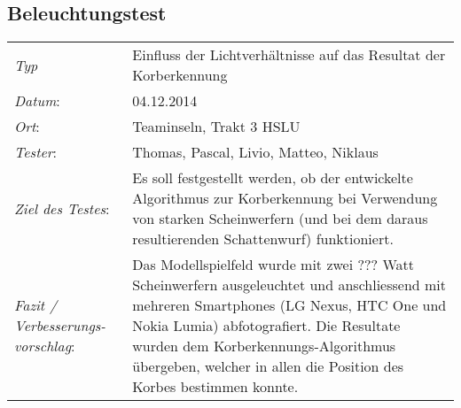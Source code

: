 \subsection{Beleuchtungstest}
\label{chap:LichtTest}
\begin{tabular}{p{3.6cm}p{9.4cm}}
	\rule{0pt}{11pt}\textit{Typ}              & Einfluss der Lichtverhältnisse auf das Resultat der Korberkennung  \\ 
	\rule{0pt}{11pt}\textit{Datum}:           & 04.12.2014   \\
	\rule{0pt}{11pt}\textit{Ort}:             & Teaminseln, Trakt 3 HSLU \\
	\rule{0pt}{11pt}\textit{Tester}:          & Thomas, Pascal, Livio, Matteo, Niklaus\\
	\rule{0pt}{11pt}\textit{Ziel des Testes}: & Es soll festgestellt werden, ob der entwickelte Algorithmus zur Korberkennung bei Verwendung von starken Scheinwerfern (und bei dem daraus resultierenden Schattenwurf) funktioniert.  \\
	\rule{0pt}{11pt}\textit{Fazit / Verbesserungs-\newline vorschlag}: & Das Modellspielfeld wurde mit zwei ??? Watt Scheinwerfern ausgeleuchtet und anschliessend mit mehreren Smartphones (LG Nexus, HTC One und Nokia Lumia) abfotografiert. Die Resultate wurden dem Korberkennungs-Algorithmus übergeben, welcher in allen die Position des Korbes bestimmen konnte.  \\
\end{tabular}